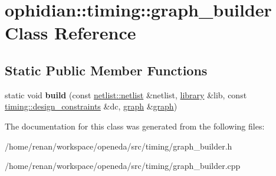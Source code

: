 \hypertarget{classophidian_1_1timing_1_1graph__builder}{\section{ophidian\-:\-:timing\-:\-:graph\-\_\-builder Class Reference}
\label{classophidian_1_1timing_1_1graph__builder}
}
\subsection*{Static Public Member Functions}
\begin{DoxyCompactItemize}
\item 
\hypertarget{classophidian_1_1timing_1_1graph__builder_a3e2366f8b89d08c41ebfbfa3d1456266}{static void {\bfseries build} (const \hyperlink{classophidian_1_1netlist_1_1netlist}{netlist\-::netlist} \&netlist, \hyperlink{classophidian_1_1timing_1_1library}{library} \&lib, const \hyperlink{structophidian_1_1timing_1_1design__constraints}{timing\-::design\-\_\-constraints} \&dc, \hyperlink{classophidian_1_1timing_1_1graph}{graph} \&\hyperlink{classophidian_1_1timing_1_1graph}{graph})}\label{classophidian_1_1timing_1_1graph__builder_a3e2366f8b89d08c41ebfbfa3d1456266}

\end{DoxyCompactItemize}


The documentation for this class was generated from the following files\-:\begin{DoxyCompactItemize}
\item 
/home/renan/workspace/openeda/src/timing/graph\-\_\-builder.\-h\item 
/home/renan/workspace/openeda/src/timing/graph\-\_\-builder.\-cpp\end{DoxyCompactItemize}
